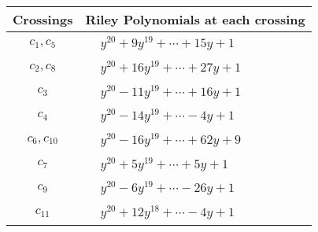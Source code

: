 \documentclass[1p]{elsarticle_modified}
\theoremstyle{definition}
\begin{document}
\begin{tabular}{m{50pt}|m{274pt}}
Crossings & \hspace{64pt}Riley Polynomials at each crossing \\
\hline $$\begin{aligned}c_{1},c_{5}\end{aligned}$$&$\begin{aligned}
&y^{20}+9 y^{19}+\cdots+15 y+1
\end{aligned}$\\
\hline $$\begin{aligned}c_{2},c_{8}\end{aligned}$$&$\begin{aligned}
&y^{20}+16 y^{19}+\cdots+27 y+1
\end{aligned}$\\
\hline $$\begin{aligned}c_{3}\end{aligned}$$&$\begin{aligned}
&y^{20}-11 y^{19}+\cdots+16 y+1
\end{aligned}$\\
\hline $$\begin{aligned}c_{4}\end{aligned}$$&$\begin{aligned}
&y^{20}-14 y^{19}+\cdots-4 y+1
\end{aligned}$\\
\hline $$\begin{aligned}c_{6},c_{10}\end{aligned}$$&$\begin{aligned}
&y^{20}-16 y^{19}+\cdots+62 y+9
\end{aligned}$\\
\hline $$\begin{aligned}c_{7}\end{aligned}$$&$\begin{aligned}
&y^{20}+5 y^{19}+\cdots+5 y+1
\end{aligned}$\\
\hline $$\begin{aligned}c_{9}\end{aligned}$$&$\begin{aligned}
&y^{20}-6 y^{19}+\cdots-26 y+1
\end{aligned}$\\
\hline $$\begin{aligned}c_{11}\end{aligned}$$&$\begin{aligned}
&y^{20}+12 y^{18}+\cdots-4 y+1
\end{aligned}$\\
\hline
\end{tabular}\\~\\
\end{document}
